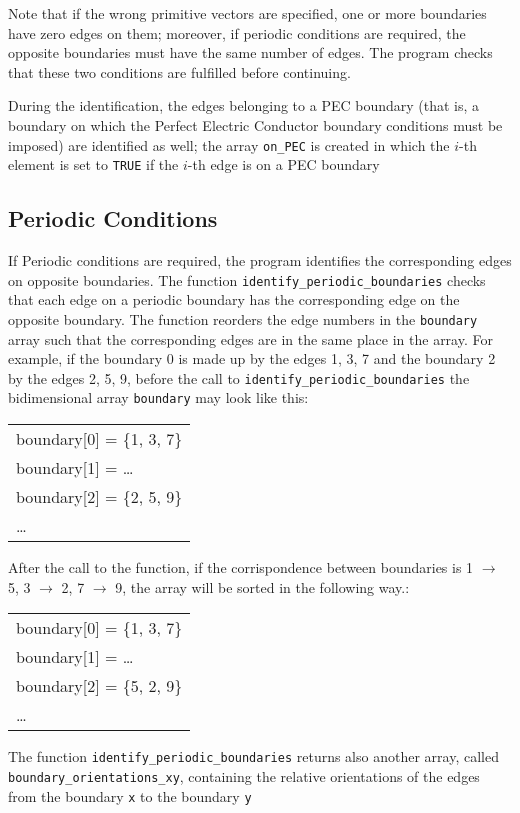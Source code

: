 \documentclass[11pt,a4paper,oneside]{article}
\begin{document}
Note that if the wrong primitive vectors are specified, one or more boundaries have zero edges on them; moreover, if periodic conditions are required, the opposite boundaries must have the same number of edges. The program checks that these two conditions are fulfilled before continuing.

During the identification, the edges belonging to a PEC boundary (that is, a boundary on which the Perfect Electric Conductor boundary conditions must be imposed) are identified as well; the array {\tt on\_PEC} is created in which the $i$-th element is set to {\tt TRUE} if the $i$-th edge is on a PEC boundary

\subsection{Periodic Conditions}
If Periodic conditions are required, the program identifies the corresponding edges on opposite boundaries. The function {\tt identify\_periodic\_boundaries} checks that each edge on a periodic boundary has the corresponding edge on the opposite boundary. The function reorders the edge numbers in the {\tt boundary} array such that the corresponding edges are in the same place in the array. For example, if the boundary 0 is made up by the edges 1, 3, 7 and the boundary 2 by the edges 2, 5, 9, before the call to {\tt identify\_periodic\_boundaries} the bidimensional array {\tt boundary} may look like this:
\begin{tabular}{l}
boundary[0] = \{1, 3, 7\} \\
boundary[1] = \dots\\
boundary[2] = \{2, 5, 9\}\\
\dots
\end{tabular}

After the call to the function, if the corrispondence between boundaries is 1 $\rightarrow$ 5, 3 $\rightarrow$ 2, 7 $\rightarrow$ 9, the array will be sorted in the following way.:
\begin{tabular}{l}
boundary[0] = \{1, 3, 7\} \\
boundary[1] = \dots\\
boundary[2] = \{5, 2, 9\}\\
\dots
\end{tabular}

The function {\tt identify\_periodic\_boundaries} returns also another array, called {\tt boundary\_orientations\_xy}, containing the relative orientations of the edges from the boundary {\tt x} to the boundary {\tt y}
\end{document}
